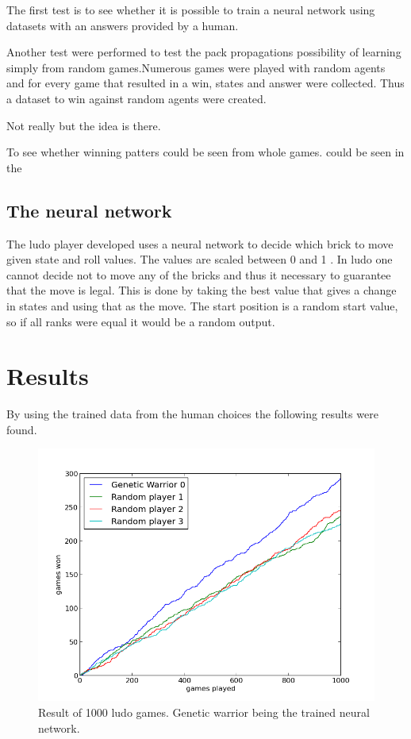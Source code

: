 \documentclass{llncs}
\begin{document}
The first test is to see whether it is possible to train a neural network using datasets with an answers provided by a human.  

Another test were performed to test the pack propagations possibility of learning simply from random games.Numerous games were played with random agents and for every game that resulted in a win, states and answer were collected. Thus a dataset to win against random agents were created. 

Not really but the idea is there.
 



To see whether winning patters could be seen from whole games.  could be seen in the 

\subsection*{The neural network}

The ludo player developed uses a neural network to decide which brick to move given state and roll values. The values are scaled between 0 and 1 . In ludo one cannot decide not to move any of the bricks and thus it necessary to guarantee that the move is legal. This is done by taking the best value that gives a change in states and using that as the move. The start position is a random start value, so if all ranks were equal it would be a random output.

\section*{Results} %

By using the trained data from the human choices the following results were found.


\begin{figure}[t]
        \centering
		\includegraphics[scale=0.3]{../lillens_gener_unscaled_u.png} 
        \caption{ Result of 1000 ludo games. Genetic warrior being the trained neural network.}\label{fig:ligener}
\end{figure} 
\end{document}
